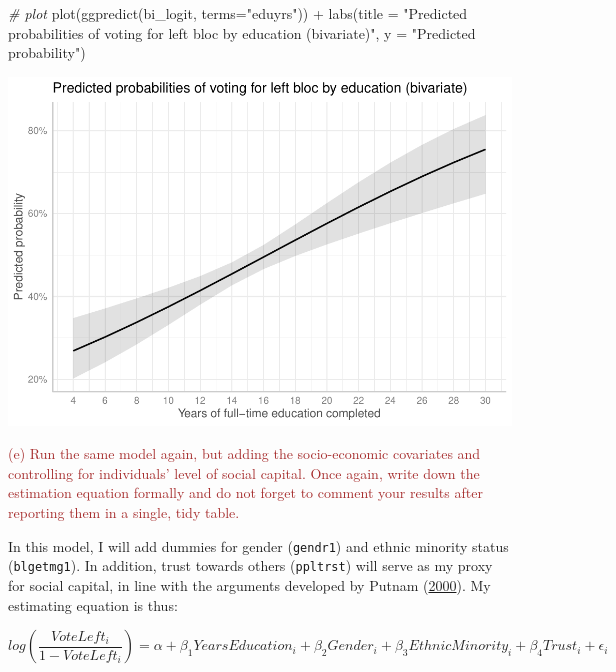 \documentclass[
]{article}
\newenvironment{Shaded}{\begin{snugshade}}{\end{snugshade}}
\newcommand{\AttributeTok}[1]{\textcolor[rgb]{0.77,0.63,0.00}{#1}}
\newcommand{\CommentTok}[1]{\textcolor[rgb]{0.56,0.35,0.01}{\textit{#1}}}
\newcommand{\FunctionTok}[1]{\textcolor[rgb]{0.00,0.00,0.00}{#1}}
\newcommand{\NormalTok}[1]{#1}
\newcommand{\SpecialCharTok}[1]{\textcolor[rgb]{0.00,0.00,0.00}{#1}}
\newcommand{\StringTok}[1]{\textcolor[rgb]{0.31,0.60,0.02}{#1}}
\begin{document}
\begin{Shaded}
\begin{Highlighting}[]
\CommentTok{\# plot }
\FunctionTok{plot}\NormalTok{(}\FunctionTok{ggpredict}\NormalTok{(bi\_logit, }\AttributeTok{terms=}\StringTok{"eduyrs"}\NormalTok{)) }\SpecialCharTok{+}
  \FunctionTok{labs}\NormalTok{(}\AttributeTok{title =} \StringTok{"Predicted probabilities of voting for left bloc by education (bivariate)"}\NormalTok{, }
       \AttributeTok{y =} \StringTok{"Predicted probability"}\NormalTok{)}
\end{Highlighting}
\end{Shaded}

\begin{center}\includegraphics{AVCD-Assignment1-Edenhofer_files/figure-latex/bi-logit-plot-1} \end{center}

\textcolor{brown}{(e) Run the same model again, but adding the socio-economic covariates and controlling for individuals’ level of social capital. Once again, write down the estimation equation formally and do not forget to comment your results after reporting them in a single, tidy table.}

In this model, I will add dummies for gender (\texttt{gendr1}) and
ethnic minority status (\texttt{blgetmg1}). In addition, trust towards
others (\texttt{ppltrst}) will serve as my proxy for social capital, in
line with the arguments developed by Putnam
(\protect\hyperlink{ref-putnam2000bowling}{2000}). My estimating
equation is thus:

\[
log(\frac{VoteLeft_{i}}{1-VoteLeft_{i}}) = \alpha + \beta_{1} YearsEducation_{i} + \beta_{2} Gender_{i} + \beta_{3} EthnicMinority_{i} + \beta_{4} Trust_{i} + \epsilon_{i} 
\]
\end{document}
